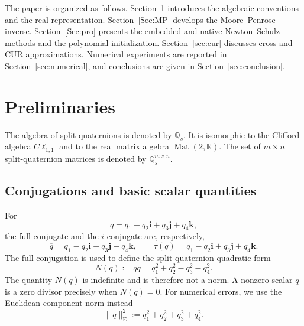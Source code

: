 \documentclass[12pt,a4paper]{article}
\theoremstyle{plain}
\theoremstyle{definition}
\theoremstyle{remark}
\begin{document}
The paper is organized as follows. Section~\ref{sec:preliminaries} introduces the algebraic conventions and the real representation. Section~\ref{Sec:MP} develops the Moore--Penrose inverse. Section~\ref{Sec:pro} presents the embedded and native Newton--Schulz methods and the polynomial initialization. Section~\ref{sec:cur} discusses cross and CUR approximations. Numerical experiments are reported in Section~\ref{sec:numerical}, and conclusions are given in Section~\ref{sec:conclusion}.

\section{Preliminaries}\label{sec:preliminaries}
The algebra of split quaternions is denoted by \(\mathbb{Q}_s\). It is isomorphic to the Clifford algebra \(C\ell_{1,1}\) and to the real matrix algebra \(\operatorname{Mat}(2,\mathbb{R})\). The set of \(m\times n\) split-quaternion matrices is denoted by \(\mathbb{Q}_s^{m\times n}\).

\subsection{Conjugations and basic scalar quantities}
For
\[
    q=q_1+q_2\mathbf{i}+q_3\mathbf{j}+q_4\mathbf{k},
\]
the full conjugate and the \(i\)-conjugate are, respectively,
\[
    \overline q=q_1-q_2\mathbf{i}-q_3\mathbf{j}-q_4\mathbf{k},
    \qquad
    \tau(q)=q_1-q_2\mathbf{i}+q_3\mathbf{j}+q_4\mathbf{k}.
\]
The full conjugation is used to define the split-quaternion quadratic form
\begin{equation}\label{norm_2}
    N(q):=q\overline q =q_1^2+q_2^2-q_3^2-q_4^2.
\end{equation}
The quantity \(N(q)\) is indefinite and is therefore not a norm. A nonzero scalar \(q\) is a zero divisor precisely when \(N(q)=0\). For numerical errors, we use the Euclidean component norm instead
\begin{equation}\label{norm}
    \|q\|_{\mathrm E}^2 :=q_1^2+q_2^2+q_3^2+q_4^2.
\end{equation}
\end{document}
